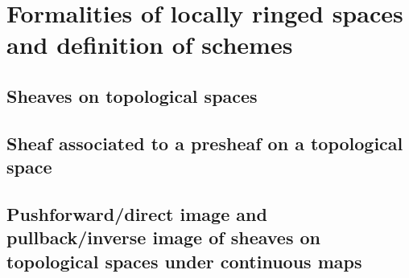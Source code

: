 \nocite{*}
\section{Formalities of locally ringed spaces and definition of schemes}

\subsection{Sheaves on topological spaces}


















\subsection{Sheaf associated to a presheaf on a topological space}





\subsection{Pushforward/direct image and pullback/inverse image of sheaves on topological spaces under continuous maps}



